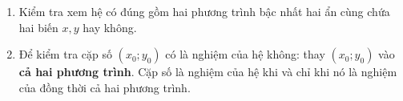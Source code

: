 \begin{enumerate}
\item Kiểm tra xem hệ có đúng gồm hai phương trình bậc nhất hai ẩn cùng chứa hai biến $x, y$ hay không.
\item Để kiểm tra cặp số $(x_0; y_0)$ có là nghiệm của hệ không: thay $(x_0; y_0)$ vào \textbf{cả hai phương trình}. Cặp số là nghiệm của hệ khi và chỉ khi nó là nghiệm của đồng thời cả hai phương trình.
\end{enumerate}
